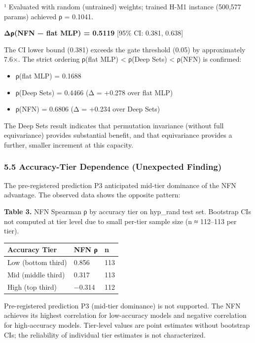 ¹ Evaluated with random (untrained) weights; trained H-M1 instance (500,577 params) achieved ρ = 0.1041.

\textbf{Δρ(NFN − flat MLP) = 0.5119} [95\% CI: 0.381, 0.638]

The CI lower bound (0.381) exceeds the gate threshold (0.05) by approximately 7.6×. The strict ordering ρ(flat MLP) < ρ(Deep Sets) < ρ(NFN) is confirmed:

\begin{itemize}
\item ρ(flat MLP) = 0.1688
\item ρ(Deep Sets) = 0.4466 (Δ = +0.278 over flat MLP)
\item ρ(NFN) = 0.6806 (Δ = +0.234 over Deep Sets)
\end{itemize}

The Deep Sets result indicates that permutation invariance (without full equivariance) provides substantial benefit, and that equivariance provides a further, smaller increment at this capacity.

\subsubsection{5.5 Accuracy-Tier Dependence (Unexpected Finding)}

The pre-registered prediction P3 anticipated mid-tier dominance of the NFN advantage. The observed data shows the opposite pattern:

\textbf{Table 3.} NFN Spearman ρ by accuracy tier on hyp_rand test set. Bootstrap CIs not computed at tier level due to small per-tier sample size (n ≈ 112–113 per tier).

\begin{table}[htbp]
\centering
\begin{tabular}{lll}
\toprule
Accuracy Tier & NFN ρ & n \\
\midrule
Low (bottom third) & 0.856 & 113 \\
Mid (middle third) & 0.317 & 113 \\
High (top third) & −0.314 & 112 \\
\bottomrule
\end{tabular}
\end{table}

Pre-registered prediction P3 (mid-tier dominance) is not supported. The NFN achieves its highest correlation for low-accuracy models and negative correlation for high-accuracy models. Tier-level values are point estimates without bootstrap CIs; the reliability of individual tier estimates is not characterized.

